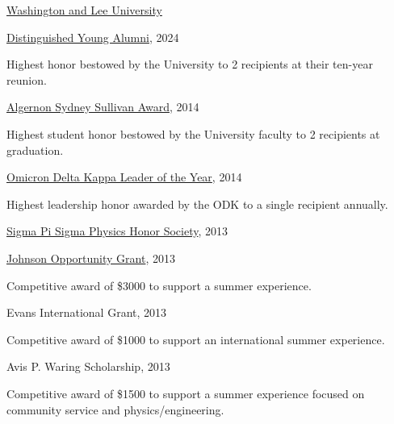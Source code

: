 \documentclass[10pt]{article}
\begin{document}
\href{https://www.wlu.edu/}{Washington and Lee University}

\begin{innerlist}
\item \href{https://columns.wlu.edu/wl-announces-2024-distinguished-young-alumni-award-winners/}{Distinguished Young Alumni}, 2024
\begin{innerlist}
\item Highest honor bestowed by the University to 2 recipients at their ten-year reunion.
\end{innerlist}
\item \href{https://www.wlu.edu/university-registrar/policies-and-procedures/university-honors-board/sullivan-award}{Algernon Sydney Sullivan Award}, 2014
\begin{innerlist}
\item Highest student honor bestowed by the University faculty to 2 recipients at graduation.
\end{innerlist}
\item \href{http://odk.org/circle/wlu/}{Omicron Delta Kappa Leader of the Year}, 2014
\begin{innerlist}
\item Highest leadership honor awarded by the ODK to a single recipient annually.
\end{innerlist}
\item \href{https://www.wlu.edu/physics-and-engineering-department/opportunities-for-students/physics-honor-society}{Sigma Pi Sigma Physics Honor Society}, 2013
\item \href{https://www.wlu.edu/johnson-program/johnson-opportunity-grants/past-recipients/2013-johnson-opportunity-grant-winners/alvin-thomas-14}{Johnson Opportunity Grant}, 2013
\begin{innerlist}
\item Competitive award of \$3000 to support a summer experience.
\end{innerlist}
\item Evans International Grant, 2013
\begin{innerlist}
\item Competitive award of \$1000 to support an international summer experience.
\end{innerlist}
\item Avis P. Waring Scholarship, 2013
\begin{innerlist}
\item Competitive award of \$1500 to support a summer experience focused on community service and physics/engineering.

\end{innerlist}
\end{innerlist}
\end{document}
